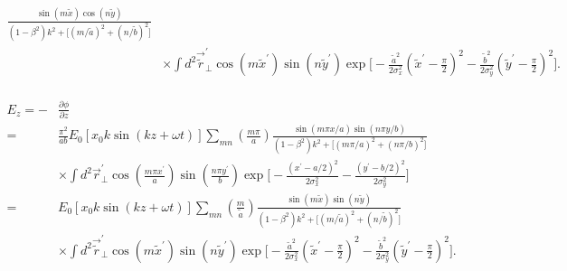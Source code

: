 \documentclass[11pt,oneside]{article}
\begin{document}
\begin{equation}
\begin{split}
    \frac{ \sin \left( m \tilde{x} \right) \cos \left( n \tilde{y} \right) }
         { \left( 1 - \beta^{2} \right) k^{2}
         + \Big[
           \left( m / \tilde{a} \right)^{2} + 
           \left( n / \tilde{b} \right)^{2}  
           \Big] }  \\
  & \times
    \int d^{2} \vec{\tilde{r}}_{\perp}^{\prime}
    \cos \left( m \tilde{x}^{\prime} \right)
    \sin \left( n \tilde{y}^{\prime} \right)
    \exp \Bigg[
       - \frac{ \tilde{a}^{2} } { 2\sigma_{x}^{2}}
         \left( \tilde{x}^{\prime} - \frac{\pi}{2} \right)^{2}
       - \frac{ \tilde{b}^{2} } { 2\sigma_{y}^{2}}
         \left( \tilde{y}^{\prime} - \frac{\pi}{2} \right)^{2}
         \Bigg] . \\
\end{split}
\end{equation}


\begin{equation}
\begin{split}
  E_{z} = - & \frac{ \partial \phi }{ \partial z } \\
=
  & \frac{\pi^{2}}{ab} E_{0}
    \left[ x_{0} k \sin( k z+\omega t) \right] 
    \sum_{mn} 
    \left( \frac{m \pi}{a} \right) 
    \frac{ \sin \left( m \pi x /a \right) \sin \left( n \pi y /b \right) }
         { \left( 1 - \beta^{2} \right) k^{2}
         + \Big[
           \left( m \pi /a \right)^{2} + \left( n \pi /b \right)^{2}
           \Big] } \\
  & \times
    \int d^{2} \vec{r}_{\perp}^{\prime}
    \cos \left( \frac{ m \pi x^{\prime} }{ a } \right)
    \sin \left( \frac{ n \pi y^{\prime} }{ b } \right)
    \exp \Bigg[
       - \frac{ \left( x^{\prime} - a/2 \right)^{2} }{ 2\sigma_{x}^{2}}
       - \frac{ \left( y^{\prime} - b/2 \right)^{2} }{ 2\sigma_{y}^{2}}
         \Bigg] \\
=
  & E_{0}
    \left[ x_{0} k \sin( k z+\omega t) \right]
    \sum_{mn} 
    \left( \frac{m}{\tilde{a}} \right)
    \frac{ \sin \left( m \tilde{x} \right) \sin \left( n \tilde{y} \right) }
         { \left( 1 - \beta^{2} \right) k^{2}
         + \Big[
           \left( m / \tilde{a} \right)^{2} + 
           \left( n / \tilde{b} \right)^{2}  
           \Big] }  \\
  & \times
    \int d^{2} \vec{\tilde{r}}_{\perp}^{\prime}
    \cos \left( m \tilde{x}^{\prime} \right)
    \sin \left( n \tilde{y}^{\prime} \right)
    \exp \Bigg[
       - \frac{ \tilde{a}^{2} } { 2\sigma_{x}^{2}}
         \left( \tilde{x}^{\prime} - \frac{\pi}{2} \right)^{2}
       - \frac{ \tilde{b}^{2} } { 2\sigma_{y}^{2}}
         \left( \tilde{y}^{\prime} - \frac{\pi}{2} \right)^{2}
         \Bigg] . \\
\end{split}
\end{equation}
\end{document}
